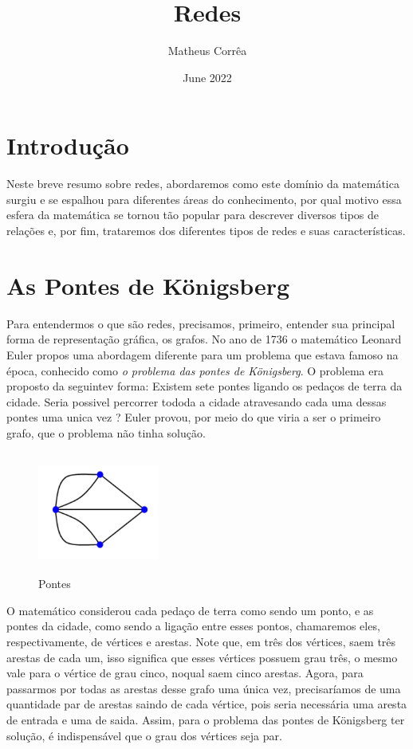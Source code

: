 \documentclass{article}
\title{Redes}
\author{Matheus Corrêa}
\date{June 2022}
\begin{document}
\maketitle

\section{Introdução}
Neste breve resumo sobre redes, abordaremos como este domínio da matemática surgiu e se espalhou para diferentes áreas do conhecimento, por qual motivo essa esfera da matemática se tornou tão popular para descrever diversos tipos de relações e, por fim, trataremos dos diferentes tipos de redes e suas características.

\section{As Pontes de Königsberg}
Para entendermos o que são redes, precisamos, primeiro, entender sua principal forma de representação gráfica, os grafos. No ano de 1736 o matemático Leonard Euler propos uma abordagem diferente para um problema que estava famoso na época, conhecido como \textit{o problema das pontes de Königsberg}. O problema era proposto da seguintev forma: Existem sete pontes ligando os pedaços de terra da cidade. Seria possivel percorrer tododa a cidade atravesando cada uma dessas pontes uma unica vez ? Euler provou, por meio do que viria a ser o primeiro grafo, que o problema não tinha solução.


\begin{figure}
    \centering
    \includegraphics[width=4cm, height=4cm]{pontes}
    \caption{Pontes}
    \label{fig:my_label}
\end{figure}


O matemático considerou cada pedaço de terra como sendo um ponto, e as pontes da cidade, como sendo a ligação entre esses pontos, chamaremos eles, respectivamente, de vértices e arestas. Note que, em três dos vértices, saem três arestas de cada um, isso significa que esses vértices possuem grau três, o mesmo vale para o vértice de grau cinco, noqual saem cinco arestas. Agora, para passarmos por todas as arestas desse grafo uma única vez, precisaríamos de uma quantidade par de arestas saindo de cada vértice, pois seria necessária uma aresta de entrada e uma de saida. Assim, para o problema das pontes de Königsberg ter solução, é indispensável que o grau dos vértices seja par.
\end{document}
